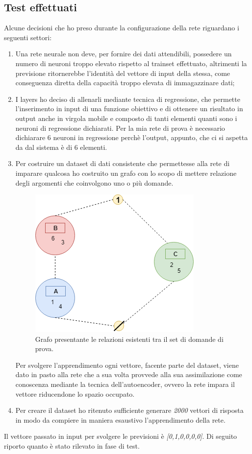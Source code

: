 \subsection{Test effettuati}
\label{Test effettuati}

Alcune decisioni che ho preso durante la configurazione della rete riguardano i seguenti settori:
\begin{enumerate}
\item Una rete neurale non deve, per fornire dei dati attendibili, possedere un numero di neuroni troppo elevato rispetto al trainset effettuato, altrimenti la previsione  ritornerebbe l'identit\`a del vettore di input della stessa, come conseguenza diretta della capacit\`a troppo elevata di immagazzinare dati;
\item I layers ho deciso di allenarli mediante tecnica di regressione, che permette l'inserimento in input di una funzione obiettivo e di ottenere un risultato in output anche in virgola mobile e composto di tanti elementi quanti sono i neuroni di regressione dichiarati. Per la mia rete di prova \`e necessario dichiarare  6 neuroni in regressione perch\`e l'output, appunto, che ci si aspetta da dal sistema \`e di 6 elementi.
\item Per costruire un dataset di dati consistente che permettesse alla rete di imparare qualcosa ho costruito un grafo con lo scopo di mettere relazione degli argomenti che coinvolgono uno o pi\`u domande.
\begin{figure}[H]
\centering
	\includegraphics[width=0.60\linewidth]{./image/grafo_trainset.png}
	\caption{Grafo presentante le relazioni esistenti tra il set di domande di prova.}
\end{figure}
\noindent
Per svolgere l'apprendimento ogni vettore, facente parte del dataset, viene dato in pasto alla rete che a sua volta provvede alla sua assimilazione come conoscenza mediante la tecnica dell'autoencoder, ovvero la rete impara il vettore riducendone lo spazio occupato.
\item Per creare il dataset ho ritenuto sufficiente generare \textit{2000} vettori di risposta in modo da compiere in maniera esaustivo l'apprendimento della rete.
\end{enumerate}
\noindent
Il vettore passato in input per svolgere le previsioni \`e \textit{[0,1,0,0,0,0]}. 
Di seguito riporto quanto \`e stato rilevato in  fase di test.

